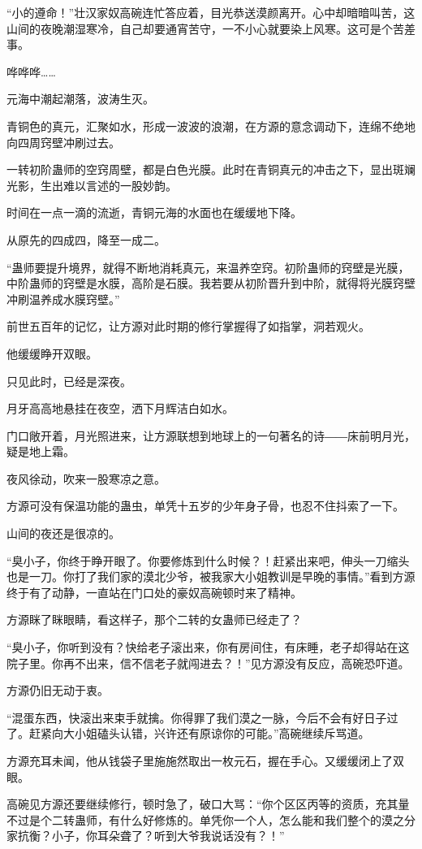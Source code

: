 \begin{this_body}
“小的遵命！”壮汉家奴高碗连忙答应着，目光恭送漠颜离开。心中却暗暗叫苦，这山间的夜晚潮湿寒冷，自己却要通宵苦守，一不小心就要染上风寒。这可是个苦差事。

哗哗哗……

元海中潮起潮落，波涛生灭。

青铜色的真元，汇聚如水，形成一波波的浪潮，在方源的意念调动下，连绵不绝地向四周窍壁冲刷过去。

一转初阶蛊师的空窍周壁，都是白色光膜。此时在青铜真元的冲击之下，显出斑斓光影，生出难以言述的一股妙韵。

时间在一点一滴的流逝，青铜元海的水面也在缓缓地下降。

从原先的四成四，降至一成二。

“蛊师要提升境界，就得不断地消耗真元，来温养空窍。初阶蛊师的窍壁是光膜，中阶蛊师的窍壁是水膜，高阶是石膜。我若要从初阶晋升到中阶，就得将光膜窍壁冲刷温养成水膜窍壁。”

前世五百年的记忆，让方源对此时期的修行掌握得了如指掌，洞若观火。

他缓缓睁开双眼。

只见此时，已经是深夜。

月牙高高地悬挂在夜空，洒下月辉洁白如水。

门口敞开着，月光照进来，让方源联想到地球上的一句著名的诗――床前明月光，疑是地上霜。

夜风徐动，吹来一股寒凉之意。

方源可没有保温功能的蛊虫，单凭十五岁的少年身子骨，也忍不住抖索了一下。

山间的夜还是很凉的。

“臭小子，你终于睁开眼了。你要修炼到什么时候？！赶紧出来吧，伸头一刀缩头也是一刀。你打了我们家的漠北少爷，被我家大小姐教训是早晚的事情。”看到方源终于有了动静，一直站在门口处的豪奴高碗顿时来了精神。

方源眯了眯眼睛，看这样子，那个二转的女蛊师已经走了？

“臭小子，你听到没有？快给老子滚出来，你有房间住，有床睡，老子却得站在这院子里。你再不出来，信不信老子就闯进去？！”见方源没有反应，高碗恐吓道。

方源仍旧无动于衷。

“混蛋东西，快滚出来束手就擒。你得罪了我们漠之一脉，今后不会有好日子过了。赶紧向大小姐磕头认错，兴许还有原谅你的可能。”高碗继续斥骂道。

方源充耳未闻，他从钱袋子里施施然取出一枚元石，握在手心。又缓缓闭上了双眼。

高碗见方源还要继续修行，顿时急了，破口大骂：“你个区区丙等的资质，充其量不过是个二转蛊师，有什么好修炼的。单凭你一个人，怎么能和我们整个的漠之分家抗衡？小子，你耳朵聋了？听到大爷我说话没有？！”

\end{this_body}

